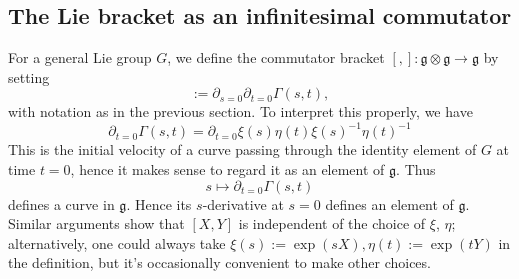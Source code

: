\documentclass[reqno]{amsart} 
\begin{document}
\subsection{The Lie bracket as an infinitesimal commutator}
\label{sec:org166886b}
For a general Lie group $G$,
we define the commutator bracket $[,] : \mathfrak{g}  \otimes
\mathfrak{g} \rightarrow \mathfrak{g}$
by setting
\begin{equation*}
  [X,Y] := \partial_{s=0}
  \partial_{t=0} \Gamma(s,t),
\end{equation*}
with notation as in the previous section.
To interpret this properly,
we have
\begin{equation*}
  \partial_{t=0}
  \Gamma(s,t)
  =
  \partial_{t=0}
  \xi(s)
  \eta(t)
  \xi(s)^{-1}
  \eta(t)^{-1}
\end{equation*}
This is the initial velocity of a curve
passing through the identity element of $G$ at time $t=0$,
hence it makes sense to regard it as an element of
$\mathfrak{g}$.
Thus
\begin{equation*}
  s \mapsto \partial_{t=0} \Gamma(s,t)
\end{equation*}
defines a curve in $\mathfrak{g}$.
Hence its $s$-derivative at $s=0$
defines an element of $\mathfrak{g}$.
Similar arguments show that $[X,Y]$ is independent of the choice of $\xi$,
$\eta$; alternatively, one could always take
$\xi(s) := \exp(s X), \eta(t) := \exp(t Y)$
in the definition, but it's occasionally convenient
to make other choices.
\end{document}
